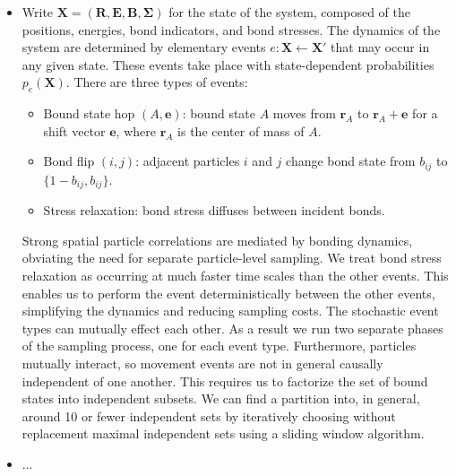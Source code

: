\documentclass[12pt,letterpaper]{article}
\newcommand{\mb}{\mathbf}
\begin{document}
\begin{itemize}
\begin{align*}
\psi((x, y)) = \begin{cases}
0, &\textnormal{there exists a particle in } \{x\} \times (y, n], \\
1, &\textnormal{else}.
\end{cases}
\end{align*}
We could also instead consider particles as imperfect absorbers and assume an exponential falloff in intensity, setting
\begin{align*}
\psi((x, y)) = \mu_{1}e^{\mu_{2}\ell} \textnormal{ if there exist} \ell > 0 \textnormal{ particles in } \{x\} \times (y, n].
\end{align*}
The constants $\mu_{1}$ and $\mu_{2}$ should be set such that an appropriate normalization holds:
\begin{align*}
\sum_{\ell = 0}^{\infty}\mu_{1}e^{-\mu_{2}\ell} = 1,
\end{align*}
giving $\mu_{1} = 1 - e^{\mu_{2}}$.
\item Write $\mb{X} = (\mb{R}, \mb{E}, \mb{B}, \boldsymbol{\Sigma})$ for the state of the system, composed of the positions, energies, bond indicators, and bond stresses. The dynamics of the system are determined by elementary events $e: \mb{X} \leftarrow \mb{X}'$ that may occur in any given state. These events take place with state-dependent probabilities $p_{e}(\mb{X})$. There are three types of events:
\begin{itemize}
\item[--] Bound state hop $(A, \mb{e})$: bound state $A$ moves from $\mb{r}_{A}$ to $\mb{r}_{A} + \mb{e}$ for a shift vector $\mb{e}$, where $\mb{r}_{A}$ is the center of mass of $A$.
\item[--] Bond flip $(i, j)$: adjacent particles $i$ and $j$ change bond state from $b_{ij}$ to $\{1 - b_{ij}, b_{ij}\}$.
\item[--] Stress relaxation: bond stress diffuses between incident bonds.
\end{itemize}
Strong spatial particle correlations are mediated by bonding dynamics, obviating the need for separate particle-level sampling. We treat bond stress relaxation as occurring at much faster time scales than the other events. This enables us to perform the event deterministically between the other events, simplifying the dynamics and reducing sampling costs. The stochastic event types can mutually effect each other. As a result we run two separate phases of the sampling process, one for each event type. Furthermore, particles mutually interact, so movement events are not in general causally independent of one another. This requires us to factorize the set of bound states into independent subsets. We can find a partition into, in general, around 10 or fewer independent sets by iteratively choosing without replacement maximal independent sets using a sliding window algorithm.
\item ...
\end{itemize}
\end{document}
